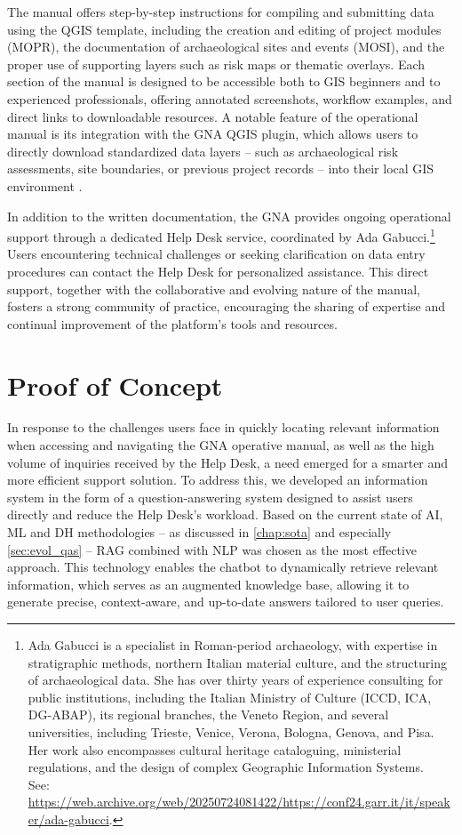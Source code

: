 \begin{spacing}{1.5}
The manual offers step-by-step instructions for compiling and submitting data using the QGIS template, including the creation and editing of project modules (MOPR), the documentation of archaeological sites and events (MOSI), and the proper use of supporting layers such as risk maps or thematic overlays. Each section of the manual is designed to be accessible both to GIS beginners and to experienced professionals, offering annotated screenshots, workflow examples, and direct links to downloadable resources. A notable feature of the operational manual is its integration with the GNA QGIS plugin, which allows users to directly download standardized data layers -- such as archaeological risk assessments, site boundaries, or previous project records -- into their local GIS environment \citep{gabucci_template_2023}.

In addition to the written documentation, the GNA provides ongoing operational support through a dedicated Help Desk service, coordinated by Ada Gabucci.\footnote{Ada Gabucci is a specialist in Roman-period archaeology, with expertise in stratigraphic methods, northern Italian material culture, and the structuring of archaeological data. She has over thirty years of experience consulting for public institutions, including the Italian Ministry of Culture (ICCD, ICA, DG-ABAP), its regional branches, the Veneto Region, and several universities, including Trieste, Venice, Verona, Bologna, Genova, and Pisa. Her work also encompasses cultural heritage cataloguing, ministerial regulations, and the design of complex Geographic Information Systems.\\See: \url{https://web.archive.org/web/20250724081422/https://conf24.garr.it/it/speaker/ada-gabucci}.\nocite{noauthor_ada_2025}} Users encountering technical challenges or seeking clarification on data entry procedures can contact the Help Desk for personalized assistance. This direct support, together with the collaborative and evolving nature of the manual, fosters a strong community of practice, encouraging the sharing of expertise and continual improvement of the platform’s tools and resources.

\section{Proof of Concept}
In response to the challenges users face in quickly locating relevant information when accessing and navigating the GNA operative manual, as well as the high volume of inquiries received by the Help Desk, a need emerged for a smarter and more efficient support solution. To address this, we developed an information system in the form of a question-answering system designed to assist users directly and reduce the Help Desk’s workload. Based on the current state of AI, ML and DH methodologies -- as discussed in \autoref{chap:sota} and especially \autoref{sec:evol_qas} -- RAG combined with NLP was chosen as the most effective approach. This technology enables the chatbot to dynamically retrieve relevant information, which serves as an augmented knowledge base, allowing it to generate precise, context-aware, and up-to-date answers tailored to user queries.


\end{spacing}
